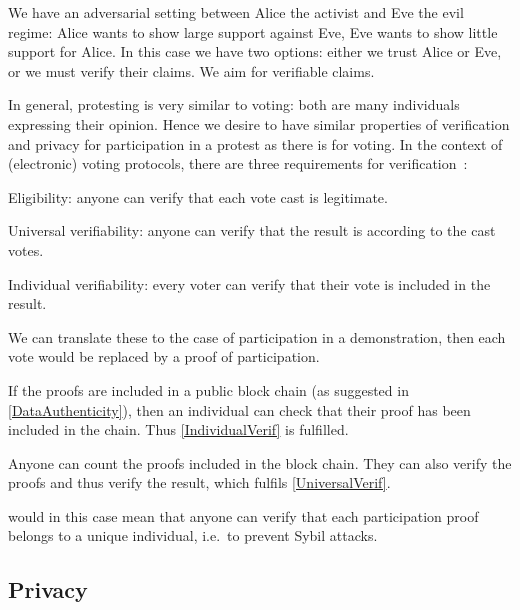 We have an adversarial setting between Alice the activist and Eve the evil 
regime: Alice wants to show large support against Eve, Eve wants to show little
support for Alice.
In this case we have two options:
either we trust Alice or Eve, or we must verify their claims.
We aim for verifiable claims.

In general, protesting is very similar to voting: both are many individuals 
expressing their opinion.
Hence we desire to have similar properties of verification and privacy for 
participation in a protest as there is for voting.
In the context of (electronic) voting protocols, there are three requirements 
for verification~\cite{VerifyingPrivacyPropertiesOfVotingProtocols}:
\begin{frame}
\begin{requirements}[V]
\item\label{EligibilityVerif} Eligibility: anyone can verify that each vote 
  cast is legitimate.
\item\label{UniversalVerif} Universal verifiability: anyone can verify that the 
  result is according to the cast votes.
\item\label{IndividualVerif} Individual verifiability: every voter can verify 
  that their vote is included in the result.
\end{requirements}
\end{frame}
We can translate these to the case of participation in a demonstration, then 
each vote would be replaced by a proof of participation.

If the proofs are included in a public block chain (as suggested in 
\cref{DataAuthenticity}), then an individual can check that their proof has 
been included in the chain.
Thus \cref{IndividualVerif} is fulfilled.

Anyone can count the proofs included in the block chain.
They can also verify the proofs and thus verify the result, which fulfils 
\cref{UniversalVerif}.

 would in this case mean that anyone can verify that 
each participation proof belongs to a unique individual, i.e.\ to prevent Sybil 
attacks.

\subsection{Privacy}
\label{Privacy}

